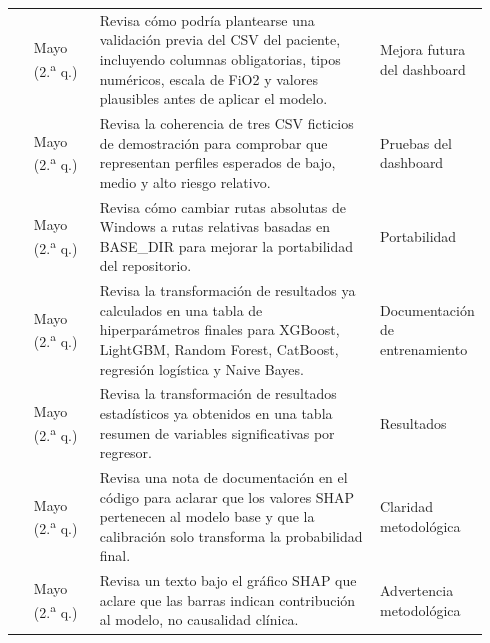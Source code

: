 \documentclass[
  spanish,
  a4paper,
  12pt,
  twoside]{memoir}
\begin{document}
{\begin{longtable*}{@{} p{0.04\linewidth} p{0.14\linewidth} p{0.60\linewidth} p{0.16\linewidth} @{}}
 & Mayo (2.\textsuperscript{a} q.) & Revisa cómo podría plantearse una validación previa del CSV del paciente, incluyendo columnas obligatorias, tipos numéricos, escala de FiO2 y valores plausibles antes de aplicar el modelo. & Mejora futura del dashboard \\
 & Mayo (2.\textsuperscript{a} q.) & Revisa la coherencia de tres CSV ficticios de demostración para comprobar que representan perfiles esperados de bajo, medio y alto riesgo relativo. & Pruebas del dashboard \\
 & Mayo (2.\textsuperscript{a} q.) & Revisa cómo cambiar rutas absolutas de Windows a rutas relativas basadas en BASE\_DIR para mejorar la portabilidad del repositorio. & Portabilidad \\
 & Mayo (2.\textsuperscript{a} q.) & Revisa la transformación de resultados ya calculados en una tabla de hiperparámetros finales para XGBoost, LightGBM, Random Forest, CatBoost, regresión logística y Naive Bayes. & Documentación de entrenamiento \\
 & Mayo (2.\textsuperscript{a} q.) & Revisa la transformación de resultados estadísticos ya obtenidos en una tabla resumen de variables significativas por regresor. & Resultados \\
 & Mayo (2.\textsuperscript{a} q.) & Revisa una nota de documentación en el código para aclarar que los valores SHAP pertenecen al modelo base y que la calibración solo transforma la probabilidad final. & Claridad metodológica \\
 & Mayo (2.\textsuperscript{a} q.) & Revisa un texto bajo el gráfico SHAP que aclare que las barras indican contribución al modelo, no causalidad clínica. & Advertencia metodológica \\
\end{longtable*}
}


\backmatter

\end{document}
